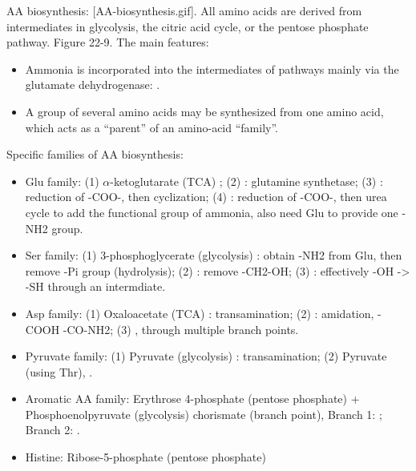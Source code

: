 \documentclass{report}
\begin{document}
\begin{enumerate}
AA biosynthesis: [AA-biosynthesis.gif]. All amino acids are derived from intermediates in glycolysis, the citric acid cycle, or the pentose phosphate pathway. Figure 22-9. The main features: 
\begin{itemize}
	\item Ammonia is incorporated into the intermediates of pathways mainly via the glutamate dehydrogenase: . 
	\item A group of several amino acids may be synthesized from one amino acid, which acts as a ``parent'' of an amino-acid ``family''. 
\end{itemize}
Specific families of AA biosynthesis: 
\begin{itemize}
	\item Glu family: (1) $\alpha$-ketoglutarate (TCA) ; (2) : glutamine synthetase; (3) : reduction of -COO-, then cyclization; (4) : reduction of -COO-, then urea cycle to add the functional group of ammonia, also need Glu to provide one -NH2 group. 
	\item Ser family: (1) 3-phosphoglycerate (glycolysis) : obtain -NH2 from Glu, then remove -Pi group (hydrolysis); (2) : remove -CH2-OH; (3) : effectively -OH -> -SH through an intermdiate.
	\item Asp family: (1) Oxaloacetate (TCA) : transamination; (2) : amidation, -COOH \ce{->} -CO-NH2; (3) , through multiple branch points. 
	\item Pyruvate family: (1) Pyruvate (glycolysis) : transamination; (2) Pyruvate  (using Thr), . 
	\item Aromatic AA family: Erythrose 4-phosphate (pentose phosphate) + Phosphoenolpyruvate (glycolysis) \ce{->} chorismate (branch point), Branch 1: ; Branch 2: . 
	\item Histine: Ribose-5-phosphate (pentose phosphate) 
\end{itemize}


\end{enumerate}
\end{document}
